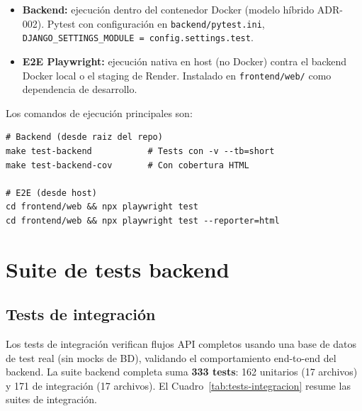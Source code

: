 \begin{itemize}
  \item \textbf{Backend:} ejecuci\'on dentro del contenedor Docker (modelo h\'ibrido ADR-002).
    Pytest con configuraci\'on en \texttt{backend/pytest.ini},
    \texttt{DJANGO\_SETTINGS\_MODULE = config.settings.test}.
  \item \textbf{E2E Playwright:} ejecuci\'on nativa en host (no Docker) contra el backend Docker
    local o el staging de Render. Instalado en \texttt{frontend/web/} como dependencia de
    desarrollo.
\end{itemize}

Los comandos de ejecuci\'on principales son:

\begin{verbatim}
# Backend (desde raiz del repo)
make test-backend           # Tests con -v --tb=short
make test-backend-cov       # Con cobertura HTML

# E2E (desde host)
cd frontend/web && npx playwright test
cd frontend/web && npx playwright test --reporter=html
\end{verbatim}

\section{Suite de tests backend}\label{sec:suite-backend}

\subsection{Tests de integraci\'on}\label{subsec:tests-integracion}

Los tests de integraci\'on verifican flujos API completos usando una base de datos de test real
(sin mocks de BD), validando el comportamiento end-to-end del backend. La suite backend
completa suma \textbf{333 tests}: 162 unitarios (17 archivos) y 171 de integraci\'on (17
archivos). El Cuadro~\ref{tab:tests-integracion} resume las suites de integraci\'on.

